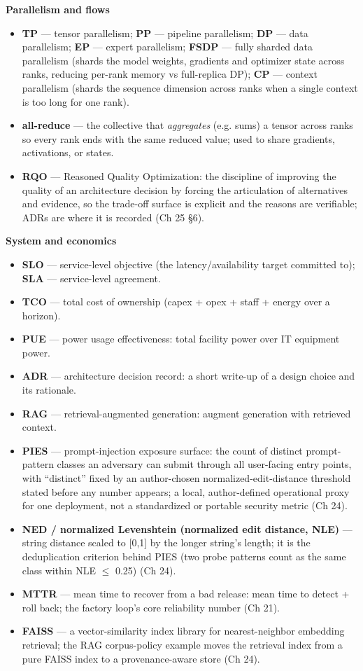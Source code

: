 \noindent\textbf{Parallelism and flows}
\begin{itemize}\tightlist
\item \textbf{TP} — tensor parallelism; \textbf{PP} — pipeline parallelism; \textbf{DP} — data parallelism; \textbf{EP} — expert parallelism; \textbf{FSDP} — fully sharded data parallelism (shards the model weights, gradients and optimizer state across ranks, reducing per-rank memory vs full-replica DP); \textbf{CP} — context parallelism (shards the sequence dimension across ranks when a single context is too long for one rank).
\item \textbf{all-reduce} — the collective that \emph{aggregates} (e.g. sums) a tensor across ranks so every rank ends with the same reduced value; used to share gradients, activations, or states.
\item \textbf{RQO} — Reasoned Quality Optimization: the discipline of improving the quality of an architecture decision by forcing the articulation of alternatives and evidence, so the trade-off surface is explicit and the reasons are verifiable; ADRs are where it is recorded (Ch 25 §6).
\end{itemize}

\noindent\textbf{System and economics}
\begin{itemize}\tightlist
\item \textbf{SLO} — service-level objective (the latency/availability target committed to); \textbf{SLA} — service-level agreement.
\item \textbf{TCO} — total cost of ownership (capex + opex + staff + energy over a horizon).
\item \textbf{PUE} — power usage effectiveness: total facility power over IT equipment power.
\item \textbf{ADR} — architecture decision record: a short write-up of a design choice and its rationale.
\item \textbf{RAG} — retrieval-augmented generation: augment generation with retrieved context.
\item \textbf{PIES} — prompt-injection exposure surface: the count of distinct prompt-pattern classes an adversary can submit through all user-facing entry points, with ``distinct'' fixed by an author-chosen normalized-edit-distance threshold stated before any number appears; a local, author-defined operational proxy for one deployment, not a standardized or portable security metric (Ch 24).
\item \textbf{NED / normalized Levenshtein (normalized edit distance, NLE)} — string distance scaled to [0,1] by the longer string's length; it is the deduplication criterion behind PIES (two probe patterns count as the same class within NLE $\le$ 0.25) (Ch 24).
\item \textbf{MTTR} — mean time to recover from a bad release: mean time to detect + roll back; the factory loop's core reliability number (Ch 21).
\item \textbf{FAISS} — a vector-similarity index library for nearest-neighbor embedding retrieval; the RAG corpus-policy example moves the retrieval index from a pure FAISS index to a provenance-aware store (Ch 24).
\end{itemize}

